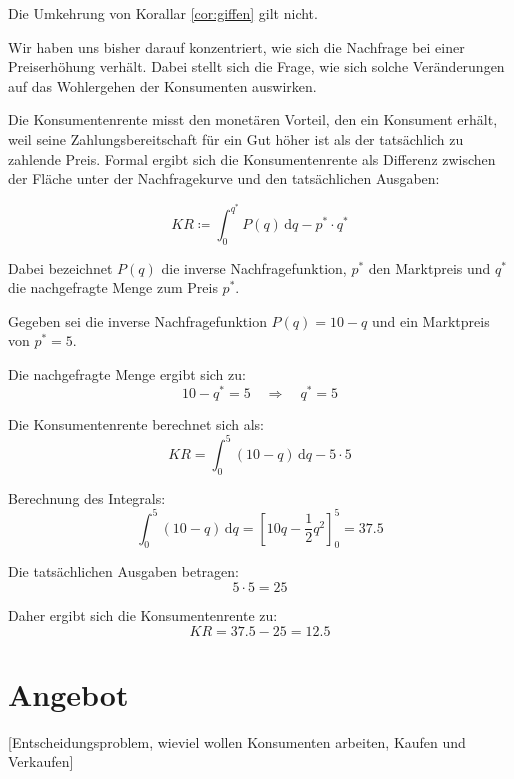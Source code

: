 \begin{remark}
	Die Umkehrung von Korallar \ref{cor:giffen} gilt nicht.
\end{remark}



Wir haben uns bisher darauf konzentriert, wie sich die Nachfrage bei einer
Preiserhöhung verhält. Dabei stellt sich die Frage, wie sich solche
Veränderungen auf das Wohlergehen der Konsumenten auswirken.


\begin{definition}[Konsumentenrente] 
	Die Konsumentenrente misst den monetären Vorteil, den ein Konsument erhält, weil seine Zahlungsbereitschaft für ein Gut höher ist als der tatsächlich zu zahlende Preis. Formal ergibt sich die Konsumentenrente als Differenz zwischen der Fläche unter der Nachfragekurve und den tatsächlichen Ausgaben:

	\[
		KR \coloneqq \int_0^{q^*} P(q) \, \mathrm{d}q - p^* \cdot q^*
	\]

	Dabei bezeichnet \( P(q) \) die inverse Nachfragefunktion, \( p^* \) den Marktpreis und \( q^* \) die nachgefragte Menge zum Preis \( p^* \).
\end{definition}


\begin{example}
	Gegeben sei die inverse Nachfragefunktion \( P(q) = 10 - q \) und ein Marktpreis von \( p^* = 5 \).

	Die nachgefragte Menge ergibt sich zu:
	\[
		10 - q^* = 5 \quad \Rightarrow \quad q^* = 5
	\]

	Die Konsumentenrente berechnet sich als:
	\[
		KR = \int_0^{5} (10 - q) \, \mathrm{d}q - 5 \cdot 5
	\]

	Berechnung des Integrals:
	\[
		\int_0^5 (10 - q) \, \mathrm{d}q = \left[ 10q - \frac{1}{2} q^2 \right]_0^5 = 37.5
	\]

	Die tatsächlichen Ausgaben betragen:
	\[
		5 \cdot 5 = 25
	\]

	Daher ergibt sich die Konsumentenrente zu:
	\[
		KR = 37.5 - 25 = 12.5
	\]
\end{example}




\section{Angebot}

[Entscheidungsproblem, wieviel wollen Konsumenten arbeiten, Kaufen und Verkaufen]


